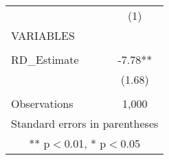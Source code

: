\begin{tabular}{lc} \hline
 & (1) \\
VARIABLES &  \\ \hline
 &  \\
RD\_Estimate & -7.78** \\
 & (1.68) \\
 &  \\
 Observations & 1,000 \\ \hline
\multicolumn{2}{c}{ Standard errors in parentheses} \\
\multicolumn{2}{c}{ ** p$<$0.01, * p$<$0.05} \\
\end{tabular}
